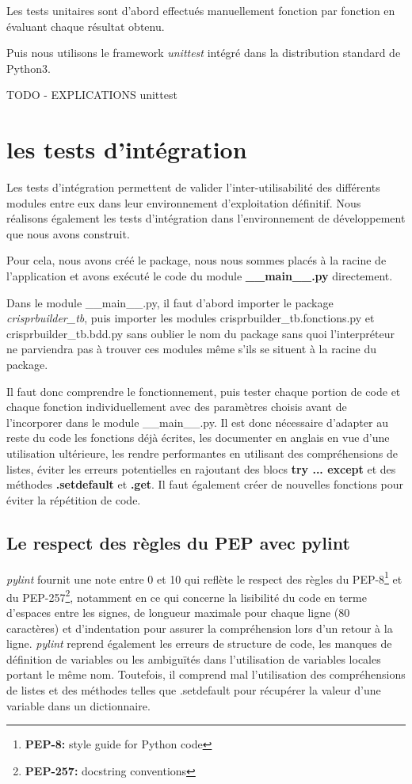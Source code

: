 \documentclass[twoside,a4paper,11pt,frenchb,openany]{report}
\begin{document}
Les tests unitaires sont d'abord effectués manuellement fonction par fonction en évaluant chaque résultat obtenu.

Puis nous utilisons le framework \textit{unittest} intégré dans la distribution standard de Python3.

TODO - EXPLICATIONS unittest





\section{les tests d'intégration}

Les tests d'intégration permettent de valider l'inter-utilisabilité des différents modules entre eux dans leur environnement d'exploitation définitif. Nous réalisons également les tests d'intégration dans l'environnement de développement que nous avons construit.

Pour cela, nous avons créé le package, nous nous sommes placés à la racine de l'application et avons exécuté le code du module \textbf{\_\_main\_\_.py} directement.

Dans le module \_\_main\_\_.py, il faut d'abord importer le package \textit{crisprbuilder\_tb}, puis importer les modules crisprbuilder\_tb.fonctions.py et crisprbuilder\_tb.bdd.py sans oublier le nom du package sans quoi l'interpréteur ne parviendra pas à trouver ces modules même s'ils se situent à la racine du package.  


Il faut donc comprendre le fonctionnement, puis tester chaque portion de code et chaque fonction individuellement avec des paramètres choisis avant de l'incorporer dans le module \_\_main\_\_.py. Il est donc nécessaire d'adapter au reste du code les fonctions déjà écrites, les documenter en anglais en vue d'une utilisation ultérieure, les rendre performantes en utilisant des compréhensions de listes, éviter les erreurs potentielles en rajoutant des blocs \textbf{try ... except} et des méthodes \textbf{.setdefault} et \textbf{.get}. Il faut également créer de nouvelles fonctions pour éviter la répétition de code.

\subsection{Le respect des règles du PEP avec pylint}

\textit{pylint} fournit une note entre 0 et 10 qui reflète le respect des règles du PEP-8\footnote{\textbf{PEP-8:} style guide for Python code} et du PEP-257\footnote{\textbf{PEP-257:} docstring conventions}, notamment en ce qui concerne la lisibilité du code en terme d'espaces entre les signes, de longueur maximale pour chaque ligne (80 caractères) et d'indentation pour assurer la compréhension lors d'un retour à la ligne. \textit{pylint} reprend également les erreurs de structure de code, les manques de définition de variables ou les ambiguïtés dans l'utilisation de variables locales portant le même nom. Toutefois, il comprend mal l'utilisation des compréhensions de listes et des méthodes telles que .setdefault pour récupérer la valeur d'une variable dans un dictionnaire.
\end{document}
